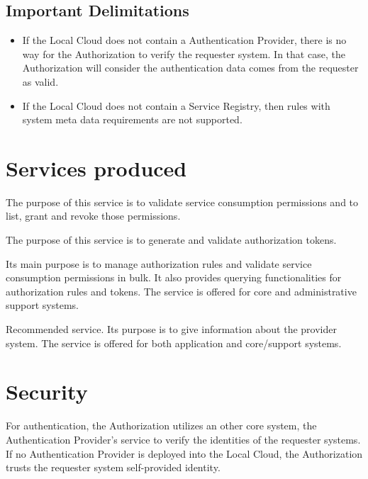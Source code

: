 \documentclass[a4paper]{arrowhead}
\begin{document}
\subsection{Important Delimitations}
\label{sec:delimitations}

\begin{itemize}
    \item  If the Local Cloud does not contain a Authentication Provider, there is no way for the Authorization to verify the requester system. In that case, the Authorization will consider the authentication data comes from the requester as valid.
    \item If the Local Cloud does not contain a Service Registry, then rules with system meta data requirements are not supported.
\end{itemize}

\newpage

\section{Services produced}
\label{sec:services}

The purpose of this service is to validate service consumption permissions and to list, grant and revoke those permissions.

The purpose of this service is to generate and validate authorization tokens.

Its main purpose is to manage authorization rules and validate service consumption permissions in bulk. It also provides querying functionalities for authorization rules and tokens. The service is offered for core and administrative support systems.  

Recommended service. Its purpose is to give information about the provider system. The service is offered for both application and core/support systems.

\newpage

\section{Security}
\label{sec:security}

For authentication, the Authorization utilizes an other core system, the Authentication Provider's service to verify the identities of the requester systems. If no Authentication Provider is deployed into the Local Cloud, the Authorization trusts the requester system self-provided identity.
\end{document}
